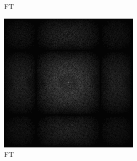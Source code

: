 \begin{figure}[H]
\begin{tcolorbox}[boxrule=4pt,sharp corners=downhill,title=Szene unter Kamerabewegung, fonttitle=\bfseries]
\begin{tcolorbox}[boxrule=4pt,sharp corners=downhill,title=Keine Projektion,colbacktitle=blue!50!white, coltitle=black]
\begin{subfigure}[b]{0.2\linewidth}
      \caption{FT}
      \label{pic:NoTemporalRepr_3_FFT}
    \end{subfigure}
    \begin{subfigure}[b]{0.2\linewidth}
        \includegraphics[width=\linewidth]{content/TemporalerAlg/Bilder/Reprojection/NoTemporalRepr/Ausschnitte/Ausschnitt4_FFT.png}
        \caption{FT}
        \label{pic:NoTemporalRepr_4_FFT}
    \end{subfigure}
    \begin{subfigure}[b]{0.2\linewidth}

\end{subfigure}
\end{tcolorbox}
\end{tcolorbox}
\end{figure}
